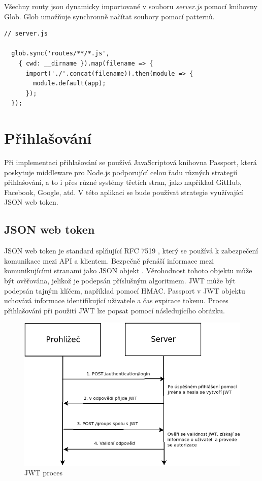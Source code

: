 \documentclass[thesis=M,czech]{FITthesis}[2018/10/20]
\begin{document}
Všechny routy jsou dynamicky importované v souboru \textit{server.js} pomocí knihovny Glob. Glob umožňuje synchronně načítat soubory pomocí patternů.

\begin{lstlisting}
// server.js 

  glob.sync('routes/**/*.js', 
    { cwd: __dirname }).map(filename => {
      import('./'.concat(filename)).then(module => {
        module.default(app);
      }); 
  });
\end{lstlisting}
\newpage
\section{Přihlašování}
Při implementaci přihlašování se používá JavaScriptová knihovna Passport, která poskytuje middleware pro Node.js podporující celou řadu různých strategií přihlašování, a to i přes různé systémy třetích stran, jako například GitHub, Facebook, Google, atd. V této aplikaci se bude používat strategie využívající JSON web token.
	\subsection{JSON web token}
	JSON web token je standard splňující RFC 7519 \cite{rfc}, který se používá k zabezpečení komunikace mezi API a klientem. Bezpečně přenáší informace mezi komunikujícími stranami jako JSON objekt \cite{jwt}. Věrohodnost tohoto objektu může být ověřována, jelikož je podepsán příslušným algoritmem. JWT může být podepsán tajným klíčem, například pomocí HMAC. Passport v JWT objektu uchovává informace identifikující uživatele a čas expirace tokenu. Proces přihlašování při použití JWT lze popsat pomocí následujícího obrázku.
\begin{figure}[h]
\caption{JWT proces}
\centering
\includegraphics[width=1\textwidth]{diagrams/jwt}
\end{figure}
\end{document}
